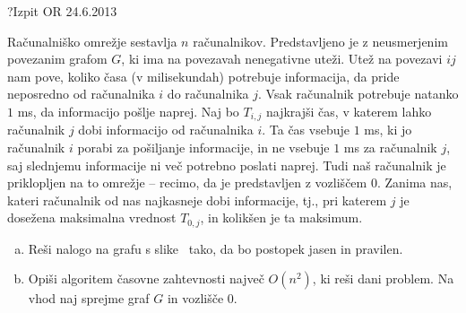 \begin{naloga}{?}{Izpit OR 24.6.2013}
\begin{vprasanje}[omrezje]
Računalniško omrežje sestavlja $n$ računalnikov.
Predstavljeno je z neusmerjenim povezanim grafom $G$,
ki ima na povezavah nenegativne uteži.
Utež na povezavi $ij$ nam pove,
koliko časa (v milisekundah) potrebuje informacija,
da pride neposredno od računalnika $i$ do računalnika $j$.
Vsak računalnik potrebuje natanko $1$ ms, da informacijo pošlje naprej.
Naj bo $T_{i,j}$ najkrajši čas,
v katerem lahko računalnik $j$ dobi informacijo od računalnika $i$.
Ta čas vsebuje $1$ ms, ki jo računalnik $i$ porabi za pošiljanje informacije,
in ne vsebuje $1$ ms za računalnik $j$,
saj slednjemu informacije ni več potrebno poslati naprej.
Tudi naš računalnik je priklopljen na to omrežje
-- recimo, da je predstavljen z vozliščem 0.
Zanima nas, kateri računalnik od nas najkasneje dobi informacije,
tj., pri katerem $j$ je dosežena maksimalna vrednost $T_{0,j}$,
in kolikšen je ta maksimum.

\begin{enumerate}[(a)]
\item Reši nalogo na grafu s slike~\fig{} tako,
da bo postopek jasen in pravilen.

\item Opiši algoritem časovne zahtevnosti največ $O(n^2)$,
ki reši dani problem.
Na vhod naj sprejme graf $G$ in vozlišče $0$.
\end{enumerate}

\begin{slika}
\pgfslika
{}
\end{slika}
\end{vprasanje}
\begin{odgovor}
\end{odgovor}
\end{naloga}


